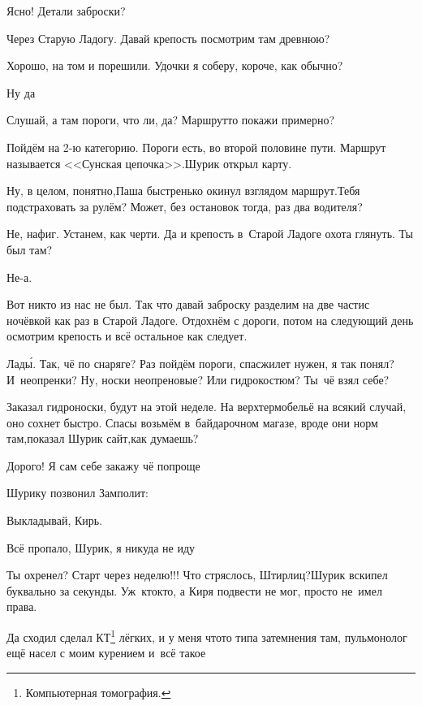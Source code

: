 \diagdash Ясно! Детали заброски?

\diagdash Через Старую Ладогу. Давай крепость посмотрим там древнюю?

\diagdash Хорошо, на том и порешили. Удочки я соберу, короче, как обычно?

\diagdash Ну да\myldots{}

\diagdash Слушай, а там пороги, что ли, да? Маршрут\sdash то покажи примерно?

\diagdash Пойдём на 2-ю категорию. Пороги есть, во второй половине пути. Маршрут называется <<Сунская цепочка>>.\mdash Шурик открыл карту.

\diagdash Ну, в целом, понятно,\mdash Паша быстренько окинул взглядом маршрут.\mdash Тебя подстраховать за рулём? Может, без остановок тогда, раз два водителя?

\diagdash Не, нафиг. Устанем, как черти. Да и крепость в~Старой Ладоге охота глянуть. Ты был там?

\diagdash Не-а.

\diagdash Вот никто из нас не был. Так что давай заброску разделим на две части\mdash с ночёвкой как раз в Старой Ладоге. Отдохнём с дороги, потом на следующий день осмотрим крепость и всё остальное как следует.

\diagdash Лад\'{ы}. Так, чё по снаряге? Раз пойдём пороги, спасжилет нужен, я так понял? И~неопренки? Ну, носки неопреновые? Или гидрокостюм? Ты~чё взял себе? %

\diagdash Заказал гидроноски, будут на этой неделе. На верх\mdash термобельё на всякий случай, оно сохнет быстро. Спасы возьмём в~байдарочном магазе, вроде они норм там,\mdash показал Шурик сайт,\mdash как думаешь?

\diagdash Дорого! Я сам себе закажу чё попроще\myldots{}

\vspace{0.5cm}
\myldots{}Шурику позвонил Замполит:

\diagdash Выкладывай, Кирь.

\diagdash Всё пропало, Шурик, я никуда не иду\myldots{}

\diagdash Ты охренел? Старт через неделю!!! Что стряслось, Штирлиц?\mdash Шурик вскипел буквально за секунды. Уж~кто\sdash кто, а Киря подвести не мог, просто не~имел права. 

\setcounter{footnote}{0}
\renewcommand*{\thefootnote}{\fnsymbol{footnote}}

\diagdash Да сходил сделал КТ\footnote{Компьютерная томография.} лёгких, и у меня что\sdash то типа затемнения там, пульмонолог ещё насел с моим курением и~всё такое\myldots{}


